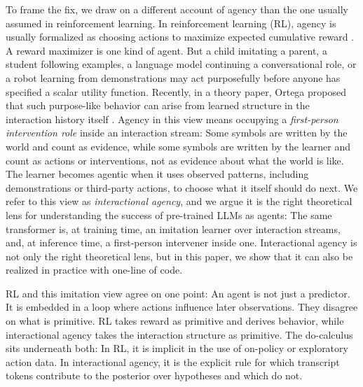 \documentclass[11pt]{article}
\begin{document}
To frame the fix, we draw on a different account of agency than the one usually assumed in reinforcement learning. In reinforcement learning (RL), agency is usually formalized as choosing actions to maximize expected cumulative reward \citep{suttonBarto2018}. A reward maximizer is one kind of agent. But a child imitating a parent, a student following examples, a language model continuing a conversational role, or a robot learning from demonstrations may act purposefully before anyone has specified a scalar utility function. Recently, in a theory paper, Ortega proposed that such purpose-like behavior can arise from learned structure in the interaction history itself \citep{ortega2026universal}. Agency in this view means occupying a \emph{first-person intervention role} inside an interaction stream: Some symbols are written by the world and count as evidence, while some symbols are written by the learner and count as actions or interventions, not as evidence about what the world is like. The learner becomes agentic when it uses observed patterns, including demonstrations or third-party actions, to choose what it itself should do next. We refer to this view as \emph{interactional agency}, and we argue it is the right theoretical lens for understanding the success of pre-trained LLMs as agents: The same transformer is, at training time, an imitation learner over interaction streams, and, at inference time, a first-person intervener inside one. Interactional agency is not only the right theoretical lens, but in this paper, we show that it can also be realized in practice with one-line of code.

RL and this imitation view agree on one point: An agent is not just a predictor. It is embedded in a loop where actions influence later observations. They disagree on what is primitive. RL takes reward as primitive and derives behavior, while interactional agency takes the interaction structure as primitive. The do-calculus sits underneath both: In RL, it is implicit in the use of on-policy or exploratory action data. In interactional agency, it is the explicit rule for which transcript tokens contribute to the posterior over hypotheses and which do not.
\end{document}
